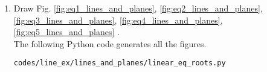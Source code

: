 \renewcommand{\theequation}{\theenumi}
\begin{enumerate}

\item Draw Fig. \ref{fig:eq1_lines_and_planes}, \ref{fig:eq2_lines_and_planes}, \ref{fig:eq3_lines_and_planes}, \ref{fig:eq4_lines_and_planes}, \ref{fig:eq5_lines_and_planes} .\\

\solution The  following Python code generates all the figures.
\begin{lstlisting}
codes/line_ex/lines_and_planes/linear_eq_roots.py
\end{lstlisting}

\end{enumerate}
